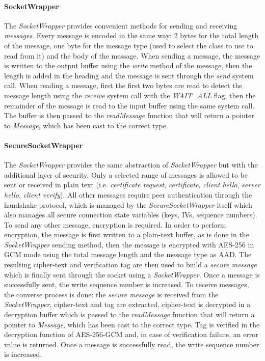\paragraph{SocketWrapper}
The \emph{SocketWrapper} provides convenient methods for sending and receiving
\emph{messages}. Every message is encoded in the same way: 2 bytes for the 
total length of the message, one byte for the message type (used to select 
the class to use to read from it) and the body of the message. 
When sending a message, the message is written to the output buffer using the
\emph{write} method of the message, then the length is added in the heading 
and the message is sent through the \emph{send} system call. 
When reading a message, first the first two bytes are read to detect the 
message length using the \emph{receive} system call with the \emph{WAIT\_ALL}
flag, then the remainder of the message is read to the input buffer using the
same system call. The buffer is then passed to the \emph{readMessage} function
that will return a pointer to \emph{Message}, which has been cast to the 
correct type. 

\paragraph{SecureSocketWrapper}
The \emph{SocketWrapper} provides the same abstraction of \emph{SocketWrapper}
but with the additional layer of security. Only a selected range of messages
is allowed to be sent or received in plain text (i.e. \emph{certificate 
request}, \emph{certificate}, \emph{client hello}, \emph{server hello},
\emph{client verify}). All other messages require peer authentication through 
the handshake protocol, which is managed by the \emph{SecureSocketWrapper}
itself which also manages all secure connection state variables (keys, IVs, 
sequence numbers).
To send any other message, encryption is required. In order to perform 
encryption, the message is first written to a
plain-text buffer, as is done in the \emph{SocketWrapper} sending method, 
then the message is encrypted with AES-256 in GCM mode using the total message
length and the message type as AAD. The resulting cipher-text and verification
tag are then used to build a \emph{secure message} which is finally sent through
the socket using a \emph{SocketWrapper}. Once a message is successfully sent, 
the write sequence number is increased.
To receive messages, the converse process is done: the \emph{secure message}
is received from the \emph{SocketWrapper}, cipher-text and tag are extracted,
cipher-text is decrypted in a decryption buffer which is passed to the 
\emph{readMessage} function that will return a pointer to \emph{Message}, which 
has been cast to the correct type. Tag is verified in the decryption function
of AES-256-GCM and, in case of verification failure, an error value is returned.
Once a message is successfully read, the write sequence number is increased.

